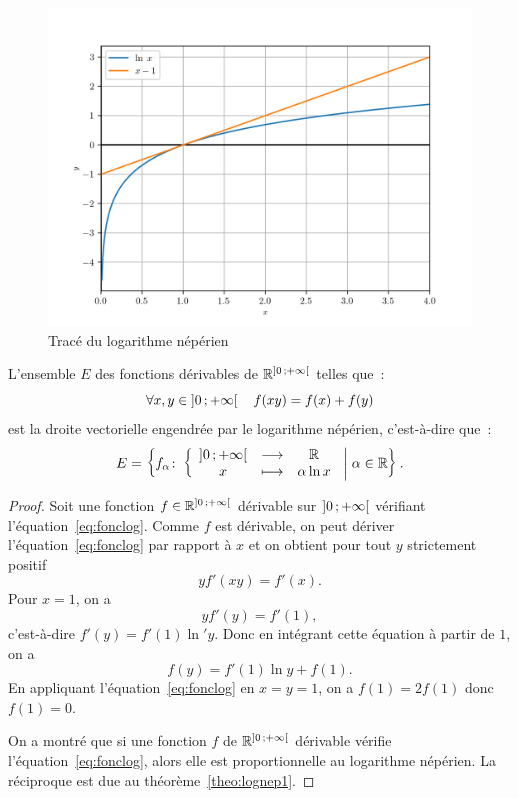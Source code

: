%
\begin{figure}
  \centering
  \includegraphics[scale=0.6]{lognep.png}
  \caption{Tracé du logarithme népérien}
  \label{fig:traceln}
\end{figure}
%
\begin{theo}
  L'ensemble $E$ des fonctions dérivables de $\mathbb{R}^{\left] 0 \, ;  +\infty \right[}$ telles que~:
  \begin{equation}
    \label{eq:fonclog}
    \forall x, y \in \left] 0 \, ;  +\infty \right[ \quad f(xy)=f(x)+f(y)
  \end{equation}
  est la droite vectorielle engendrée par le logarithme népérien, c'est-à-dire que~:
  \begin{equation}
    E=\left\{f_{\alpha}\colon \left\{\begin{array}{ccc} \left] 0 \, ;  +\infty \right[ & \longrightarrow &\mathbb{R}\\ x & \longmapsto & \alpha \ln x \end{array} \right.\mathrel{}\middle|\mathrel{}\alpha \in \mathbb{R}\right\}.
  \end{equation}
\end{theo}
\begin{proof}
  Soit une fonction $f \in \mathbb{R}^{\left] 0 \, ;  +\infty \right[}$ dérivable sur $\left] 0 \, ;  +\infty \right[$ vérifiant l'équation~\eqref{eq:fonclog}. Comme $f$ est dérivable, on peut dériver l'équation~\eqref{eq:fonclog} par rapport à $x$ et on obtient pour tout $y$ strictement positif
  \begin{equation}
    y f'(xy)=f'(x).
  \end{equation}
  Pour $x=1$, on a
  \begin{equation}
    y f'(y)=f'(1),
  \end{equation}
  c'est-à-dire $f'(y)=f'(1) \ln' y$. Donc en intégrant cette équation à partir de $1$, on a
  \begin{equation}
    f(y)=f'(1)\ln y + f(1).
  \end{equation}
  En appliquant l'équation~\eqref{eq:fonclog} en $x=y=1$, on a $f(1)=2f(1)$ donc $f(1)=0$.

  On a montré que si une fonction $f$ de $\mathbb{R}^{\left] 0 \, ;  +\infty \right[}$ dérivable vérifie l'équation~\eqref{eq:fonclog}, alors elle est proportionnelle au logarithme népérien. La réciproque est due au théorème~\ref{theo:lognep1}.
\end{proof}
%
